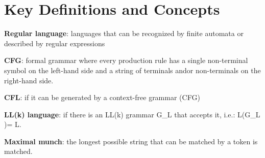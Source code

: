 \section{Key Definitions and Concepts}
\textbf{Regular language}: languages that can be recognized by finite automata or described by regular expressions

\textbf{CFG}: formal grammar where every production rule has a single non-terminal symbol on the left-hand side and a string of terminals and\/or non-terminals on the right-hand side.

\textbf{CFL}: if it can be generated by a context-free grammar (CFG)

\textbf{LL(k) language}: if there is an LL(k) grammar G_L that accepts it, i.e.: L(G_L )= L.

\textbf{Maximal munch}: the longest possible string that can be matched by a token is matched.
